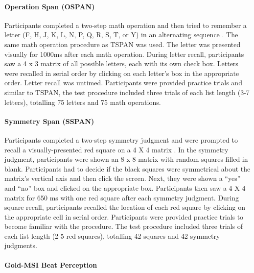 \documentclass[]{book}
\let\oldparagraph\paragraph
\renewcommand{\paragraph}[1]{\oldparagraph{#1}\mbox{}}
\begin{document}
\hypertarget{operation-span-ospan}{%
\paragraph{Operation Span (OSPAN)}\label{operation-span-ospan}}

Participants completed a two-step math operation and then tried to remember a letter (F, H, J, K, L, N, P, Q, R, S, T, or
Y) in an alternating sequence \citep{unsworthAutomatedVersionOperation2005}.
The same math operation procedure as TSPAN was used.
The letter was presented visually for 1000ms after each math
operation.
During letter recall, participants saw a 4 x 3 matrix of all possible letters, each with its own check box.
Letters were recalled in serial order by clicking on each letter's box in the appropriate order.
Letter recall was untimed.
Participants were provided practice trials and similar to TSPAN, the test procedure included three trials of each list length (3-7 letters), totalling 75 letters and 75 math operations.

\hypertarget{symmetry-span-sspan}{%
\paragraph{Symmetry Span (SSPAN)}\label{symmetry-span-sspan}}

Participants completed a two-step symmetry judgment and were prompted to recall a visually-presented red square on a 4 X 4 matrix \citep{unsworthAutomatedVersionOperation2005}.
In the symmetry judgment, participants were shown an 8 x 8 matrix with random squares filled in blank.
Participants had to decide if the black squares were symmetrical about the matrix's vertical axis and then click the screen.
Next, they were shown a ``yes'' and ``no'' box and clicked on the appropriate box.
Participants then saw a 4 X 4 matrix for 650 ms with one red square after each symmetry judgment.
During square recall, participants recalled the location of each red square by clicking on the appropriate cell in serial order.
Participants were provided practice trials to become familiar with the procedure.
The test procedure included three trials of each list length (2-5 red squares), totalling 42 squares and 42 symmetry judgments.

\hypertarget{gold-msi-beat-perception}{%
\paragraph{Gold-MSI Beat Perception}\label{gold-msi-beat-perception}}
\end{document}
